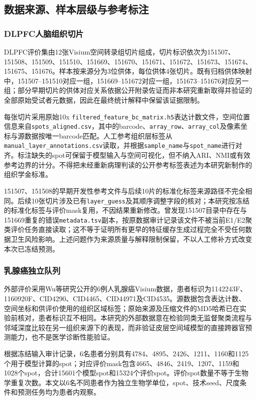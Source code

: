 \subsection{数据来源、样本层级与参考标注}
\label{subsec:cc-data-v1}

\subsubsection{DLPFC人脑组织切片}
DLPFC评价集由12张Visium空间转录组切片组成，切片标识依次为151507、151508、151509、151510、151669、151670、151671、151672、151673、151674、151675、151676。样本按来源分为3位供体，每位供体4张切片。既有归档供体映射中，151507--151510对应一组，151669--151672对应一组，151673--151676对应另一组；部分早期切片的供体对应关系依据公开附录佐证而非本研究重新取得并验证的全部原始受试者元数据，因此在最终统计解释中保留该证据限制。

每张切片采用原始10x \texttt{filtered\_feature\_bc\_matrix.h5}表达计数文件，空间位置信息来自\texttt{spots\_aligned.csv}，其中的barcode、\texttt{array\_row}、\texttt{array\_col}及像素坐标与源数据按唯一barcode匹配。人工参考组织层标签从\texttt{manual\_layer\_annotations.csv}读取，并根据\texttt{sample\_name}与\texttt{spot\_name}进行对齐。标注缺失的spot可保留于模型输入与空间可视化，但不纳入ARI、NMI或有效参考边界的计分。不得把未经重新病理判读的公开参考标签表述为本研究新制作的组织学金标准。

151507、151508的早期开发性参考文件与后续10片的标准化标签来源路径不完全相同。后续10张切片涉及已有\texttt{layer\_guess}及其顺序调整字段的核对；本研究按冻结的标准化标签与评价mask复用，不因结果重新修改。曾发现151507目录中存在与151669重复的错误\texttt{metadata.tsv}副本，按原数据审计记录该文件不被当前E1/E2聚类评价任务直接读取；这不等于证明所有更早的特征缓存生成过程完全不受任何数据卫生风险影响。上述问题作为来源质量与解释限制保留，不以人工修补方式改变本次已冻结预测。

\subsubsection{乳腺癌独立队列}
外部评价采用Wu等研究公开的6例人乳腺癌Visium数据，患者标识为1142243F、1160920F、CID4290、CID4465、CID44971及CID4535。源数据包含表达计数、空间坐标和供评价使用的组织区域标签；原始来源及压缩文件的MD5哈希已在实验前核对，患者标识互不相同。本研究的外部数据意在检验同类无监督聚类流程与邻域深度比较在另一组织来源下的表现，而非验证皮层空间域模型的直接跨器官预测能力，也不是医学诊断性能验证。

根据冻结输入审计记录，6名患者分别具有4784、4895、2426、1211、1160和1125个用于模型计算的spot；对应评价mask包含4665、4846、2419、1207、1159和1028个spot，合计15601个模型spot和15324个评价spot。评价spot数量不等于生物学重复次数。本文以6名不同患者作为独立生物学单位，spot、技术seed、尺度条件和预测任务均为患者内观察。

